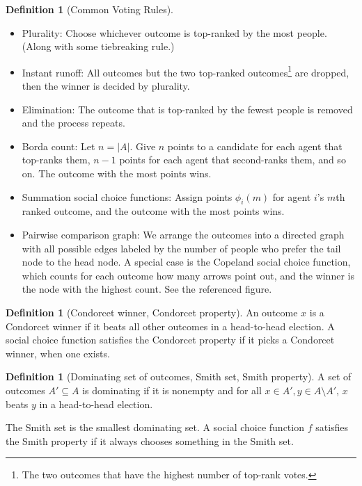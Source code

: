 \documentclass[10pt]{article}
\numberwithin{equation}{section}
\theoremstyle{definition}
\newtheorem{definition}[theorem]{Definition}
\begin{document}
\begin{definition}[Common Voting Rules]
	\begin{itemize}
		\item Plurality: Choose whichever outcome is top-ranked by the most people. (Along with some tiebreaking rule.)
		\item Instant runoff: All outcomes but the two top-ranked outcomes\footnote{The two outcomes that have the highest number of top-rank votes.} are dropped, then the winner is decided by plurality.
		\item Elimination: The outcome that is top-ranked by the fewest people is removed and the process repeats.
		\item Borda count: Let $n = \left| A \right|$. Give $n$ points to a candidate for each agent that top-ranks them, $n-1$ points for each agent that second-ranks them, and so on. The outcome with the most points wins.
		\item Summation social choice functions: Assign points $\phi_i(m)$ for agent $i$'s $m$th ranked outcome, and the outcome with the most points wins.
		\item Pairwise comparison graph: We arrange the outcomes into a directed graph with all possible edges labeled by the number of people who prefer the tail node to the head node. A special case is the Copeland social choice function, which counts for each outcome how many arrows point out, and the winner is the node with the highest count. See the referenced figure.
	\end{itemize}
\end{definition}

\begin{definition}[Condorcet winner, Condorcet property]
	An outcome $x$ is a Condorcet winner if it beats all other outcomes in a head-to-head election. A social choice function satisfies the Condorcet property if it picks a Condorcet winner, when one exists.
\end{definition}

\begin{definition}[Dominating set of outcomes, Smith set, Smith property]
	A set of outcomes $A' \subseteq A$ is dominating if it is nonempty and for all $x \in A', y \in A \setminus A'$, $x$ beats $y$ in a head-to-head election.

	The Smith set is the smallest dominating set. A social choice function $f$ satisfies the Smith property if it always chooses something in the Smith set.
\end{definition}
\end{document}

